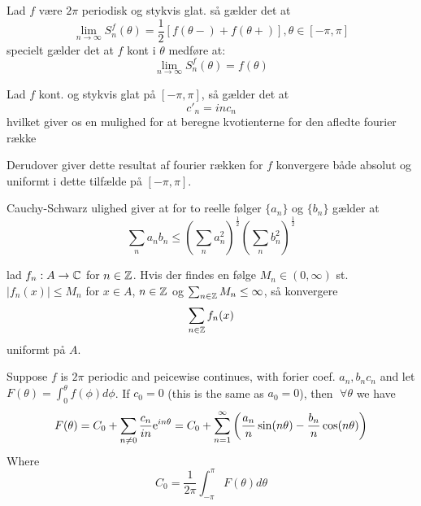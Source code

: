 \begin{theorem}
  Lad $f$ være $2\pi$ periodisk og stykvis glat. så gælder det at
  \begin{equation*}
    \lim_{n \to \infty} S_{n}^{f} (\theta) = \frac{1}{2} [f(\theta-) + f(\theta+)], \theta \in [-\pi, \pi]
  \end{equation*}
  specielt gælder det at $f$ kont i $\theta$ medføre at:
  \begin{equation*}
    \lim_{n \to \infty}  S_{n}^{f} (\theta) = f(\theta)
  \end{equation*}
\end{theorem}

\begin{proposition}
  Lad $f$ kont. og stykvis glat på $[-\pi, \pi]$, så gælder det at
  \begin{equation*}
    c'_{n} = in c_{n}
  \end{equation*}
  hvilket giver os en mulighed for at beregne kvotienterne for den afledte fourier række
\end{proposition}
\begin{remark}
  Derudover giver dette resultat af fourier rækken for $f$ konvergere både absolut og uniformt i dette tilfælde på $[-\pi, \pi]$.
\end{remark}

\begin{proposition}
  Cauchy-Schwarz ulighed giver at for to reelle følger $\{a_{n}\}$ og $\{b_{n}\}$ gælder at
  \begin{equation*}
    \sum_n a_{n} b_{n} \leq \left(\sum_n a_{n}^{2} \right)^{\frac{1}{2}} \left(\sum_n b_{n}^{2}\right)^{\frac{1}{2}}
  \end{equation*}
\end{proposition}
\begin{proposition}
  lad $f_{n}: A \to \mathbb{C}$ for $n \in \mathbb{Z}$. Hvis der findes en følge $M_{n} \in (0, \infty)$ st. $|f_{n}(x)| \leq M_{n}$ for $x \in A$, $n \in \mathbb{Z}$ og $\sum_{n \in \mathbb{Z}} M_{n} \leq \infty$, så konvergere
  \begin{equation*}
    \sum_{n\in \mathbb{Z}} f_{n}(x)
  \end{equation*}
  uniformt på $A$.
\end{proposition}


\begin{theorem}
  Suppose $f$ is $2\pi$ periodic and peicewise continues, with forier coef. $a_{n}, b_{n} c_{n}$ and let $F(\theta) = \int_0^{\theta} f(\phi) d \phi$. If $c_{0} = 0$ (this is the same as $a_{0} = 0$), then $\;\forall \theta$ we have
  \begin{equation*}
    F(\theta) = C_{0} + \sum_{n \neq 0} \frac{c_{n}}{in} \mathrm{e}^{in \theta} = C_{0} + \sum_{n=1}^{\infty} \left(\frac{a_{n}}{n} \sin(n \theta) - \frac{b_{n}}{n} \cos(n \theta)\right)
  \end{equation*}
  Where
  \begin{equation*}
    C_{0} = \frac{1}{2\pi} \int_{-\pi}^{\pi} F(\theta) d \theta
  \end{equation*}
\end{theorem}


